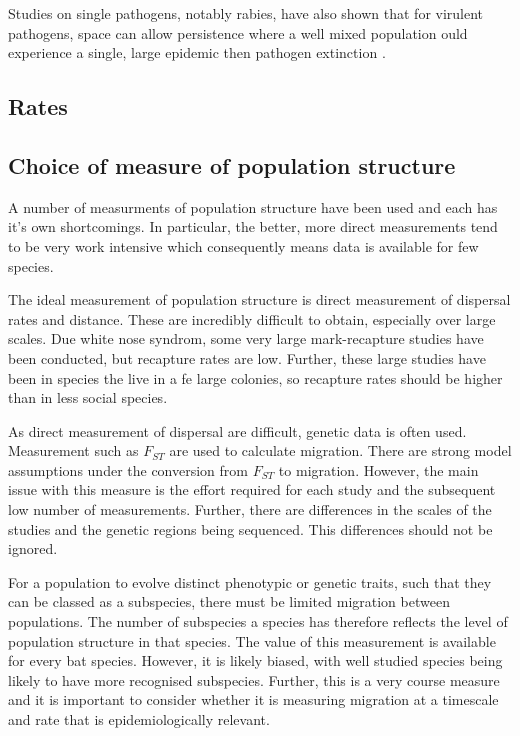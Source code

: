 Studies on single pathogens, notably rabies, have also shown that for virulent pathogens, space can allow persistence where a well mixed population ould experience a single, large epidemic then pathogen extinction \cite{blackwood2013resolving, colizza, pons2014insights}.

\subsection{Rates}



\subsection{Choice of measure of population structure}

A number of measurments of population structure have been used and each has it's own shortcomings.
In particular, the better, more direct measurements tend to be very work intensive which consequently means data is available for few species.


The ideal measurement of population structure is direct measurement of dispersal rates and distance.
These are incredibly difficult to obtain, especially over large scales.
Due white nose syndrom, some very large mark-recapture studies have been conducted, but recapture rates are low.
Further, these large studies have been in species the live in a fe large colonies, so recapture rates should be higher than in less social species.




As direct measurement of dispersal are difficult, genetic data is often used.
Measurement such as $F_{ST}$ are used to calculate migration.
There are strong model assumptions under the conversion from $F_{ST}$ to migration.
However, the main issue with this measure is the effort required for each study and the subsequent low number of measurements.
Further, there are differences in the scales of the studies and the genetic regions being sequenced.
This differences should not be ignored.


For a population to evolve distinct phenotypic or genetic traits, such that they can be classed as a subspecies, there must be limited migration between populations.
The number of subspecies a species has therefore reflects the level of population structure in that species.
The value of this measurement is available for every bat species.
However, it is likely biased, with well studied species being likely to have more recognised subspecies.
Further, this is a very course measure and it is important to consider whether it is measuring migration at a timescale and rate that is epidemiologically relevant.

